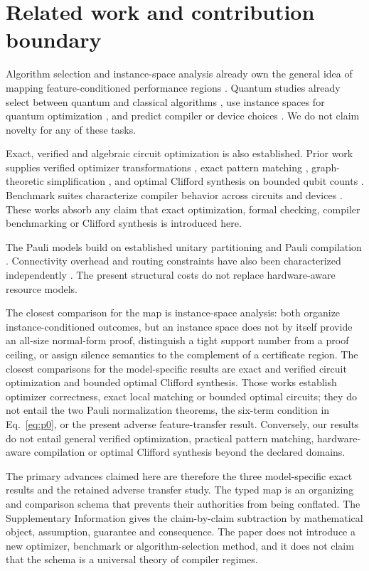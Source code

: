\section{Related work and contribution boundary}

Algorithm selection and instance-space analysis already own the general idea of mapping feature-conditioned performance regions \cite{rice1976algorithm,smithmiles2009meta,smithmiles2023isa}.  Quantum studies already select between quantum and classical algorithms \cite{moussa2020selection}, use instance spaces for quantum optimization \cite{katial2025qaoa}, and predict compiler or device choices \cite{quetschlich2023options,quetschlich2025predictor}.  We do not claim novelty for any of these tasks.

Exact, verified and algebraic circuit optimization is also established.  Prior work supplies verified optimizer transformations \cite{hietala2021verified}, exact pattern matching \cite{iten2022patterns}, graph-theoretic simplification \cite{duncan2020zx}, and optimal Clifford synthesis on bounded qubit counts \cite{bravyi2022clifford}.  Benchmark suites characterize compiler behavior across circuits and devices \cite{li2023qasmbench,quetschlich2023mqtbench}.  These works absorb any claim that exact optimization, formal checking, compiler benchmarking or Clifford synthesis is introduced here.

The Pauli models build on established unitary partitioning and Pauli compilation \cite{izmaylov2020unitary,peres2023pbc,vandenberg2020diagonalization,paykin2023pcoast}.  Connectivity overhead and routing constraints have also been characterized independently \cite{yuan2025connectivity}.  The present structural costs do not replace hardware-aware resource models.

The closest comparison for the map is instance-space analysis: both organize instance-conditioned outcomes, but an instance space does not by itself provide an all-size normal-form proof, distinguish a tight support number from a proof ceiling, or assign silence semantics to the complement of a certificate region.  The closest comparisons for the model-specific results are exact and verified circuit optimization and bounded optimal Clifford synthesis.  Those works establish optimizer correctness, exact local matching or bounded optimal circuits; they do not entail the two Pauli normalization theorems, the six-term condition in Eq.~\eqref{eq:p0}, or the present adverse feature-transfer result.  Conversely, our results do not entail general verified optimization, practical pattern matching, hardware-aware compilation or optimal Clifford synthesis beyond the declared domains.

The primary advances claimed here are therefore the three model-specific exact results and the retained adverse transfer study.  The typed map is an organizing and comparison schema that prevents their authorities from being conflated.  The Supplementary Information gives the claim-by-claim subtraction by mathematical object, assumption, guarantee and consequence.  The paper does not introduce a new optimizer, benchmark or algorithm-selection method, and it does not claim that the schema is a universal theory of compiler regimes.
